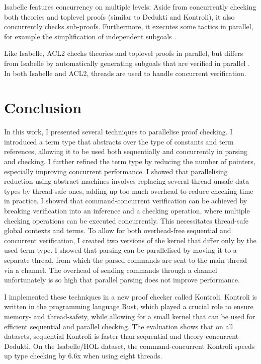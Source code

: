 \documentclass[screen,sigplan,10pt]{acmart}
\begin{document}
Isabelle features concurrency on multiple levels: Aside from
concurrently checking both theories and toplevel proofs (similar to
Dedukti and Kontroli), it also concurrently checks sub-proofs.
Furthermore, it executes some tactics in parallel, for example the
simplification of independent subgoals
\citep{wenzel2009, DBLP:conf/itp/Wenzel13}.

Like Isabelle, ACL2 checks theories and toplevel proofs in parallel, but
differs from Isabelle by automatically generating subgoals that are
verified in parallel \citep{DBLP:conf/itp/RagerHK13}. In both Isabelle
and ACL2, threads are used to handle concurrent verification.

\hypertarget{conclusion}{%
\section{Conclusion}\label{conclusion}}

In this work, I presented several techniques to parallelise proof
checking. I introduced a term type that abstracts over the type of
constants and term references, allowing it to be used both sequentially
and concurrently in parsing and checking. I further refined the term
type by reducing the number of pointers, especially improving concurrent
performance. I showed that parallelising reduction using abstract
machines involves replacing several thread-unsafe data types by
thread-safe ones, adding up too much overhead to reduce checking time in
practice. I showed that command-concurrent verification can be achieved
by breaking verification into an inference and a checking operation,
where multiple checking operations can be executed concurrently. This
necessitates thread-safe global contexts and terms. To allow for both
overhead-free sequential and concurrent verification, I created two
versions of the kernel that differ only by the used term type. I showed
that parsing can be parallelised by moving it to a separate thread, from
which the parsed commands are sent to the main thread via a channel. The
overhead of sending commands through a channel unfortunately is so high
that parallel parsing does not improve performance.

I implemented these techniques in a new proof checker called Kontroli.
Kontroli is written in the programming language Rust, which played a
crucial role to ensure memory- and thread-safety, while allowing for a
small kernel that can be used for efficient sequential and parallel
checking. The evaluation shows that on all datasets, sequential Kontroli
is faster than sequential and theory-concurrent Dedukti. On the
Isabelle/HOL dataset, the command-concurrent Kontroli speeds up type
checking by 6.6x when using eight threads.
\end{document}
